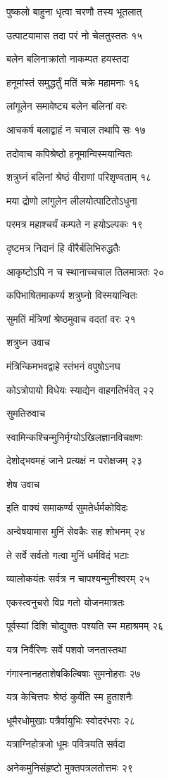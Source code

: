 पुष्कलो बाहुना धृत्वा चरणौ तस्य भूतलात्

उत्पाटयामास तदा परं नो चेलतुस्ततः १५

बलेन बलिनाक्रांतो नाकम्पत हयस्तदा

हनूमांस्तं समुद्धर्तुं मतिं चक्रे महामनाः १६

लांगूलेन समावेष्ट्य बलेन बलिनां वरः

आचकर्ष बलाद्वाहं न चचाल तथापि सः १७

तदोवाच कपिश्रेष्ठो हनूमान्विस्मयान्वितः

शत्रुघ्नं बलिनां श्रेष्ठं वीराणां परिशृण्वताम् १८

मया द्रोणो लांगुलेन लीलयोत्पाटितोऽधुना

परमत्र महाश्चर्यं कम्पते न हयोऽल्पकः १९

दृष्टमत्र निदानं हि वीरैर्बलिभिरुद्धतैः

आकृष्टोऽपि न च स्थानाच्चचाल तिलमात्रतः २०

कपिभाषितमाकर्ण्य शत्रुघ्नो विस्मयान्वितः

सुमतिं मंत्रिणां श्रेष्ठमुवाच वदतां वरः २१

शत्रुघ्न उवाच

मंत्रिन्किमभवद्वाहे स्तंभनं वपुषोऽनघ

कोऽत्रोपायो विधेयः स्याद्येन वाहगतिर्भवेत् २२

सुमतिरुवाच

स्वामिन्कश्चिन्मुनिर्मृग्योऽखिलज्ञानविचक्षणः

देशोद्भवमहं जाने प्रत्यक्षं न परोक्षजम् २३

शेष उवाच

इति वाक्यं समाकर्ण्य सुमतेर्धर्मकोविदः

अन्वेषयामास मुनिं सेवकैः सह शोभनम् २४

ते सर्वे सर्वतो गत्वा मुनिं धर्मविदं भटाः

व्यालोकयंतः सर्वत्र न चापश्यन्मुनीश्वरम् २५

एकस्त्वनुचरो विप्र गतो योजनमात्रतः

पूर्वस्यां दिशि चोद्युक्तः पश्यति स्म महाश्रमम् २६

यत्र निर्वैरिणः सर्वे पशवो जनतास्तथा

गंगास्नानहताशेषकिल्बिषाः सुमनोहराः २७

यत्र केचित्तपः श्रेष्ठं कुर्वंति स्म हुताशनैः

धूमैरधोमुखाः पत्रैर्वायुभिः स्वोदरंभराः २८

यत्राग्निहोत्रजो धूमः पवित्रयति सर्वदा

अनेकमुनिसंहृष्टो मुक्तपत्रलतोत्तमः २९

